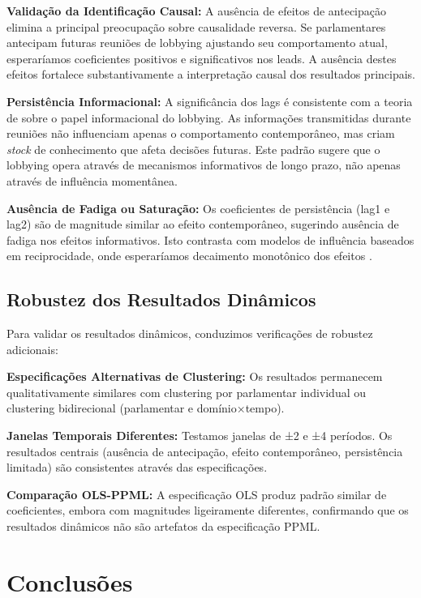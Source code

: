 \textbf{Validação da Identificação Causal:} A ausência de efeitos de antecipação elimina a principal preocupação sobre causalidade reversa. Se parlamentares antecipam futuras reuniões de lobbying ajustando seu comportamento atual, esperaríamos coeficientes positivos e significativos nos leads. A ausência destes efeitos fortalece substantivamente a interpretação causal dos resultados principais.

\textbf{Persistência Informacional:} A significância dos lags é consistente com a teoria de \cite{hall1996institutional} sobre o papel informacional do lobbying. As informações transmitidas durante reuniões não influenciam apenas o comportamento contemporâneo, mas criam \emph{stock} de conhecimento que afeta decisões futuras. Este padrão sugere que o lobbying opera através de mecanismos informativos de longo prazo, não apenas através de influência momentânea.

\textbf{Ausência de Fadiga ou Saturação:} Os coeficientes de persistência (lag1 e lag2) são de magnitude similar ao efeito contemporâneo, sugerindo ausência de fadiga nos efeitos informativos. Isto contrasta com modelos de influência baseados em reciprocidade, onde esperaríamos decaimento monotônico dos efeitos \cite{grossman2001special}.

\subsection{Robustez dos Resultados Dinâmicos}

Para validar os resultados dinâmicos, conduzimos verificações de robustez adicionais:

\textbf{Especificações Alternativas de Clustering:} Os resultados permanecem qualitativamente similares com clustering por parlamentar individual ou clustering bidirecional (parlamentar e domínio×tempo).

\textbf{Janelas Temporais Diferentes:} Testamos janelas de ±2 e ±4 períodos. Os resultados centrais (ausência de antecipação, efeito contemporâneo, persistência limitada) são consistentes através das especificações.

\textbf{Comparação OLS-PPML:} A especificação OLS produz padrão similar de coeficientes, embora com magnitudes ligeiramente diferentes, confirmando que os resultados dinâmicos não são artefatos da especificação PPML.

\section{Conclusões}

